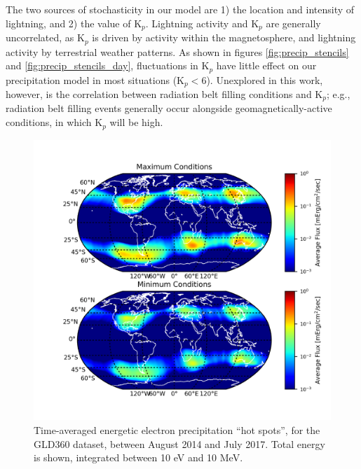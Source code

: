 The two sources of stochasticity in our model are 1) the location and intensity of lightning, and 2) the value of K$_p$. Lightning activity and K$_p$ are generally uncorrelated, as K$_p$ is driven by activity within the magnetosphere, and lightning activity by terrestrial weather patterns. As shown in figures \ref{fig:precip_stencils} and \ref{fig:precip_stencils_day}, fluctuations in K$_p$ have little effect on our precipitation model in most situations (K$_p < 6$). Unexplored in this work, however, is the correlation between radiation belt filling conditions and K$_p$; e.g., radiation belt filling events generally occur alongside geomagnetically-active conditions, in which K$_p$ will be high.

\begin{figure}[]
\begin{center}
\includegraphics{figures/global_precip_map_max_min.png}
\caption[Global energy deposition ``hot spots'' for maximal and minimal radiation belt populations]{Time-averaged energetic electron precipitation ``hot spots'', for the GLD360 dataset, between August 2014 and July 2017. Total energy is shown, integrated between 10 eV and 10 MeV. }
\label{fig:global_precip_map_max_min}
\end{center}
\end{figure}

